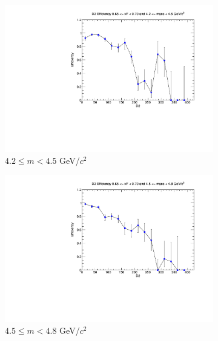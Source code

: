 \documentclass[11pt]{article}
\begin{document}
\begin{figure}[p]
    \centering
    \begin{subfigure}[b]{0.32\textwidth}
        \centering
        \includegraphics[width=\textwidth]{./kTrackerEfficiencyPlots/D2_Efficiency_xF13_mass0.pdf}
        \caption{$4.2 \leq m < 4.5$ GeV/$c^2$}
    \end{subfigure}\hfill
    \begin{subfigure}[b]{0.32\textwidth}
        \centering
        \includegraphics[width=\textwidth]{./kTrackerEfficiencyPlots/D2_Efficiency_xF13_mass1.pdf}
        \caption{$4.5 \leq m < 4.8$ GeV/$c^2$}
    \end{subfigure}\hfill
    \begin{subfigure}[b]{0.32\textwidth}
        \centering

\end{subfigure}
\end{figure}
\end{document}
